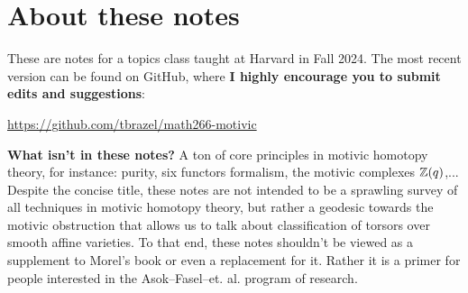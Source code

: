 \documentclass[11pt,openany]{book}
\begin{document}
\dominitoc

\maketitle

\setcounter{tocdepth}{1}

\setcounter{minitocdepth}{2}


\tableofcontents{}
 

\setlength{\parskip}{0.2em}

\setcounter{section}{-1}

\section*{About these notes}

These are notes for a topics class taught at Harvard in Fall 2024. The most recent version can be found on GitHub, where \textbf{I highly encourage you to submit edits and suggestions}:
\begin{center}
    \href{https://github.com/tbrazel/math266-motivic}{https://github.com/tbrazel/math266-motivic}
\end{center}

\textbf{What isn't in these notes?} A ton of core principles in motivic homotopy theory, for instance: purity, six functors formalism, the motivic complexes $\mathbb{Z}(q)$,... Despite the concise title, these notes are not intended to be a sprawling survey of all techniques in motivic homotopy theory, but rather a geodesic towards the motivic obstruction that allows us to talk about classification of torsors over smooth affine varieties. To that end, these notes shouldn't be viewed as a supplement to Morel's book or even a replacement for it. Rather it is a primer for people interested in the Asok--Fasel--et. al. program of research.
\end{document}
